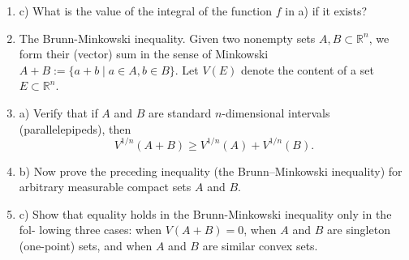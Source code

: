 \begin{enumerate}
    \item c) What is the value of the integral of the function $f$ in a) if it exists?
    \item The Brunn-Minkowski inequality. Given two nonempty sets $A, B \subset \mathbb{R}^n$, we form
    their (vector) sum in the sense of Minkowski $A + B := \{a + b \mid a \in A, b \in B\}$. Let
    $V(E)$ denote the content of a set $E \subset \mathbb{R}^n$.
    \item a) Verify that if $A$ and $B$ are standard $n$-dimensional intervals (parallelepipeds),
    then
    $$V^{1/n}(A + B) \ge V^{1/n}(A) + V^{1/n}(B).$$
    \item b) Now prove the preceding inequality (the Brunn–Minkowski inequality) for
    arbitrary measurable compact sets $A$ and $B$.
    \item c) Show that equality holds in the Brunn-Minkowski inequality only in the fol-
    lowing three cases: when $V(A + B) = 0$, when $A$ and $B$ are singleton (one-point)
    sets, and when $A$ and $B$ are similar convex sets.
\end{enumerate}